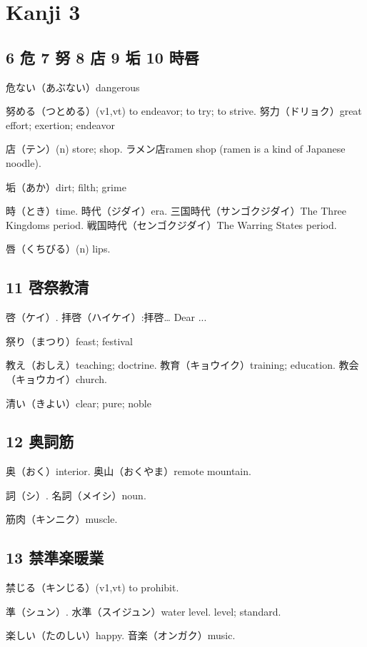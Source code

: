 \chapter{Kanji 3}

\section{6 危 7 努 8 店 9 垢 10 時唇}

危ない（あぶない）dangerous

努める（つとめる）(v1,vt) to endeavor; to try; to strive.
努力（ドリョク）great effort; exertion; endeavor

店（テン）(n) store; shop.
ラメン店ramen shop (ramen is a kind of Japanese noodle).

垢（あか）dirt; filth; grime

時（とき）time.
時代（ジダイ）era.
三国時代（サンゴクジダイ）The Three Kingdoms period.
戦国時代（センゴクジダイ）The Warring States period.

唇（くちびる）(n) lips.

\section{11 啓祭教清}

啓（ケイ）.
拝啓（ハイケイ）:拝啓… Dear ...

祭り（まつり）feast; festival

教え（おしえ）teaching; doctrine.
教育（キョウイク）training; education.
教会（キョウカイ）church.

清い（きよい）clear; pure; noble

\section{12 奥詞筋}

奥（おく）interior.
奥山（おくやま）remote mountain.

詞（シ）.
名詞（メイシ）noun.

筋肉（キンニク）muscle.

\section{13 禁準楽暖業}

禁じる（キンじる）(v1,vt) to prohibit.

準（シュン）.
水準（スイジュン）water level. level; standard.

楽しい（たのしい）happy.
音楽（オンガク）music.

